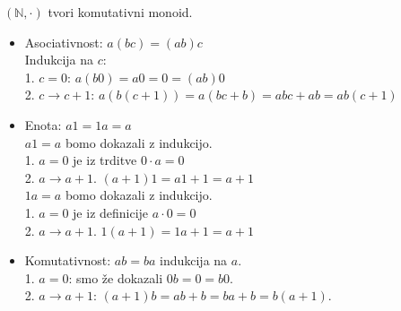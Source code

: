\begin{trditev}
    $(\mathbb{N}, \cdot)$ tvori komutativni monoid.
\end{trditev}
\begin{dokaz}
    \begin{itemize}

    \item Asociativnost: $a(bc) = (ab)c$ \\
    Indukcija na $c$: \\
    1. $c = 0$: $a(b0) = a0 = 0 = (ab)0$ \\
    2. $c \to c + 1$: $a(b(c + 1)) = a(bc + b) = abc + ab = ab(c + 1)$ \\

    \item Enota: $a1 = 1a = a$ \\
    $a1 = a$ bomo dokazali z indukcijo. \\
    1. $a = 0$ je iz trditve $0\cdot a = 0$ \\
    2. $a \to a + 1$. $(a + 1)1 = a1 + 1 = a + 1$ \\
    $1a = a$ bomo dokazali z indukcijo. \\
    1. $a = 0$ je iz definicije $a\cdot 0 = 0$ \\
    2. $a \to a + 1$. $1(a + 1) = 1a + 1 = a + 1$ \\

    \item Komutativnost: $ab = ba$ indukcija na $a$. \\
    1. $a = 0$: smo že dokazali $0b = 0 = b0$. \\
    2. $a \to a + 1$: $(a + 1)b = ab + b = ba + b = b(a + 1)$.
    \end{itemize}
\end{dokaz}